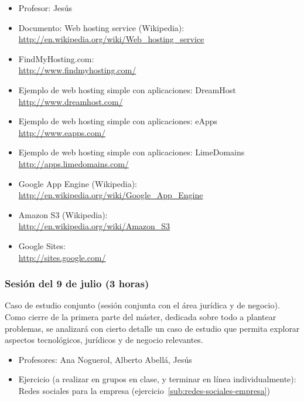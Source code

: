 \documentclass[a4paper,12pt]{article}
\begin{document}
\begin{itemize}
\item Profesor: Jesús

\item Documento: Web hosting service (Wikipedia): \\
  \url{http://en.wikipedia.org/wiki/Web_hosting_service}

\item FindMyHosting.com: \\
  \url{http://www.findmyhosting.com/}

\item Ejemplo de web hosting simple con aplicaciones: DreamHost \\
  \url{http://www.dreamhost.com/}

\item Ejemplo de web hosting simple con aplicaciones: eApps \\
  \url{http://www.eapps.com/}

\item Ejemplo de web hosting simple con aplicaciones: LimeDomains \\
  \url{http://apps.limedomains.com/}

\item Google App Engine (Wikipedia):\\
  \url{http://en.wikipedia.org/wiki/Google_App_Engine}

\item Amazon S3 (Wikipedia): \\
  \url{http://en.wikipedia.org/wiki/Amazon_S3}

\item Google Sites: \\
  \url{http://sites.google.com/}
\end{itemize}


\subsubsection{Sesión del 9 de julio (3 horas)}

Caso de estudio conjunto (sesión conjunta con el área jurídica y de negocio). Como cierre de la primera parte del máster, dedicada sobre todo a plantear problemas, se analizará con cierto detalle un caso de estudio que permita explorar aspectos tecnológicos, jurídicos y de negocio relevantes.

\begin{itemize}
\item Profesores: Ana Noguerol, Alberto Abellá, Jesús
\item Ejercicio (a realizar en grupos en clase, y terminar en línea individualmente): Redes sociales para la empresa (ejercicio~\ref{sub:redes-sociales-empresa})
\end{itemize}
\end{document}
